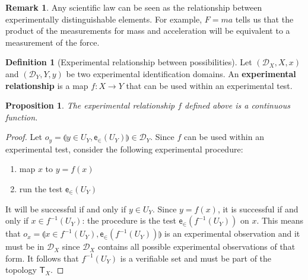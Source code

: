 \documentclass{amsart}
\newtheorem{prop}[thm]{Proposition}
\theoremstyle{definition}
\newtheorem{defn}[thm]{Definition}
\newtheorem{rem}[thm]{Remark}
\numberwithin{equation}{section}
\begin{document}
\begin{rem}
	Any scientific law can be seen as the relationship between experimentally distinguishable elements. For example, $F=ma$ tells us that the product of the measurements for mass and acceleration will be equivalent to a measurement of the force.
\end{rem}


\begin{defn}[Experimental relationship between possibilities]
	Let \linebreak $(\mathcal{D}_X, X, x)$ and $(\mathcal{D}_Y, Y, y)$ be two experimental identification domains. An \textbf{experimental relationship} is a map $f : X \rightarrow Y$ that can be used within an experimental test.
\end{defn}

\begin{prop}
	The experimental relationship $f$ defined above is a continuous function.
\end{prop}
\begin{proof}
Let $o_y = \llparenthesis y\in U_Y,\mathsf{e}_{\in}(U_Y)\rrparenthesis \in \mathcal{D}_Y$.  Since $f$ can be used within an experimental test, consider the following experimental procedure:
\begin{enumerate}
	\item map $x$ to $y=f(x)$
	\item run the test $\mathsf{e}_{\in}(U_Y)$
\end{enumerate}
It will be successful if and only if $y \in U_Y$. Since $y=f(x)$, it is successful if and only if $x \in f^{-1}(U_Y)$: the procedure is the test $\mathsf{e}_{\in}(f^{-1}(U_Y))$ on $x$. This means that $o_x = \llparenthesis x \in f^{-1}(U_Y),\mathsf{e}_{\in}(f^{-1}(U_Y))\rrparenthesis$ is an experimental observation and it must be in $\mathcal{D}_X$ since $\mathcal{D}_X$ contains all possible experimental observations of that form. It follows that $f^{-1}(U_Y)$ is a verifiable set and must be part of the topology $\mathsf{T}_X$.
\end{proof}
\end{document}
